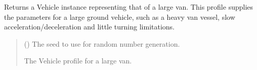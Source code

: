 \documentclass[letterpaper,10pt,english]{sphinxmanual}
\begin{document}
\begin{fulllineitems}
\label{\detokenize{modules/waypoints/vehicle:qnav.waypoints.vehicle.get_large_van_profile}}
\pysigstartsignatures
{}
\pysigstopsignatures
\sphinxAtStartPar
Returns a Vehicle instance representing that of a large van.
This profile supplies the parameters for a large ground vehicle, such as
a heavy van vessel, slow acceleration/deceleration and little turning
limitations.
\begin{quote}\begin{description}
\sphinxAtStartPar
{} () \textendash{} The seed to use for random number generation.

\sphinxAtStartPar
The Vehicle profile for a large van.

\sphinxAtStartPar
{\hyperref[\detokenize{modules/waypoints/vehicle:qnav.waypoints.vehicle.Vehicle}]{}}

\end{description}\end{quote}

\end{fulllineitems}

\end{document}
